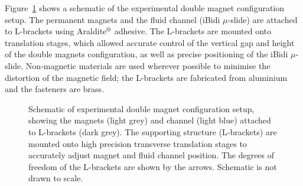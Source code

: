 Figure~\ref{fig:doubleMagnetConfigurationExperimentSetupSchematic} shows a schematic of the experimental double magnet configuration setup. The permanent magnets and the fluid channel (iBidi $\mu$-slide) are attached to L-brackets using Araldite$^\text{\textregistered}$ adhesive. The L-brackets are mounted onto translation stages, which allowed accurate control of the vertical gap and height of the double magnets configuration, as well as precise positioning of the iBidi $\mu$-slide. Non-magnetic materials are used wherever possible to minimise the distortion of the magnetic field; the L-brackets are fabricated from aluminium and the fasteners are brass.

\begin{figure}[htb]%
\centering
{}
\caption[Schematic of experimental double magnet configuration setup]{Schematic of experimental double magnet configuration setup, showing the magnets (light grey) and channel (light blue) attached to L-brackets (dark grey). The supporting structure (L-brackets) are mounted onto high precision transverse translation stages to accurately adjust magnet and fluid channel position. The degrees of freedom of the L-brackets are shown by the arrows. Schematic is not drawn to scale.}%
\label{fig:doubleMagnetConfigurationExperimentSetupSchematic}%
\end{figure}

